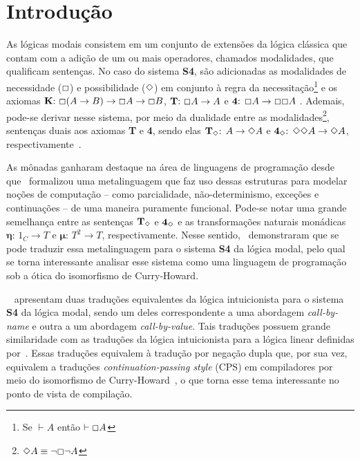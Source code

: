 \chapter{Introdução}

As lógicas modais consistem em um conjunto de extensões da lógica clássica que contam com a adição de um ou mais operadores, chamados modalidades, que qualificam sentenças. No caso do sistema \textbf{S4}, são adicionadas as modalidades de necessidade ($\Box$) e possibilidade ($\Diamond$) em conjunto à regra da necessitação\footnote{Se $\vdash A$ então $\vdash \Box A$} e os axiomas $\text{\textbf{K}: } \Box(A \to B) \to \Box A \to \Box B$, $\text{\textbf{T}: } \Box A \to A$ e $\text{\textbf{4}: } \Box A \to \Box \Box A$ \citep{Troelstra}. Ademais, pode-se derivar nesse sistema, por meio da dualidade entre as modalidades\footnote{$\Diamond A \equiv \neg \Box \neg A $}, sentenças duais aos axiomas \textbf{T} e \textbf{4}, sendo elas $\boldsymbol{\text{\textbf{T}}_\Diamond \text{: }} A \to \Diamond A$ e $\boldsymbol{\text{\textbf{4}}_\Diamond \text{: }} \Diamond \Diamond A \to \Diamond A$, respectivamente~\cite{Zach}.

As mônadas ganharam destaque na área de linguagens de programação desde que~\cite{Moggi} formalizou uma metalinguagem que faz uso dessas estruturas para modelar noções de computação -- como parcialidade, não-determinismo, exceções e continuações -- de uma maneira puramente funcional. Pode-se notar uma grande semelhança entre as sentenças $\boldsymbol{\text{\textbf{T}}_\Diamond}$ e $\boldsymbol{\text{\textbf{4}}_\Diamond}$ e as transformações naturais monádicas $\boldsymbol{\eta \text{: }} 1_C \to T$ e $\boldsymbol{\mu \text{: }} T^2 \to T$, respectivamente. Nesse sentido,~\cite{Pfenning} demonstraram que se pode traduzir essa metalinguagem para o sistema \textbf{S4} da lógica modal, pelo qual se torna interessante analisar esse sistema como uma linguagem de programação sob a ótica do isomorfismo de Curry-Howard.

~\cite{Troelstra} apresentam duas traduções equivalentes da lógica intuicionista para o sistema \textbf{S4} da lógica modal, sendo um deles correspondente a uma abordagem \textit{call-by-name} e outra a um abordagem \textit{call-by-value}. Tais traduções possuem grande similaridade com as traduções da lógica intuicionista para a lógica linear definidas por~\cite{Girard}. Essas traduções equivalem à tradução por negação dupla que, por sua vez, equivalem a traduções \textit{continuation-passing style} (CPS) em compiladores por meio do isomorfismo de Curry-Howard~\cite{Reynolds}, o que torna esse tema interessante no ponto de vista de compilação.

